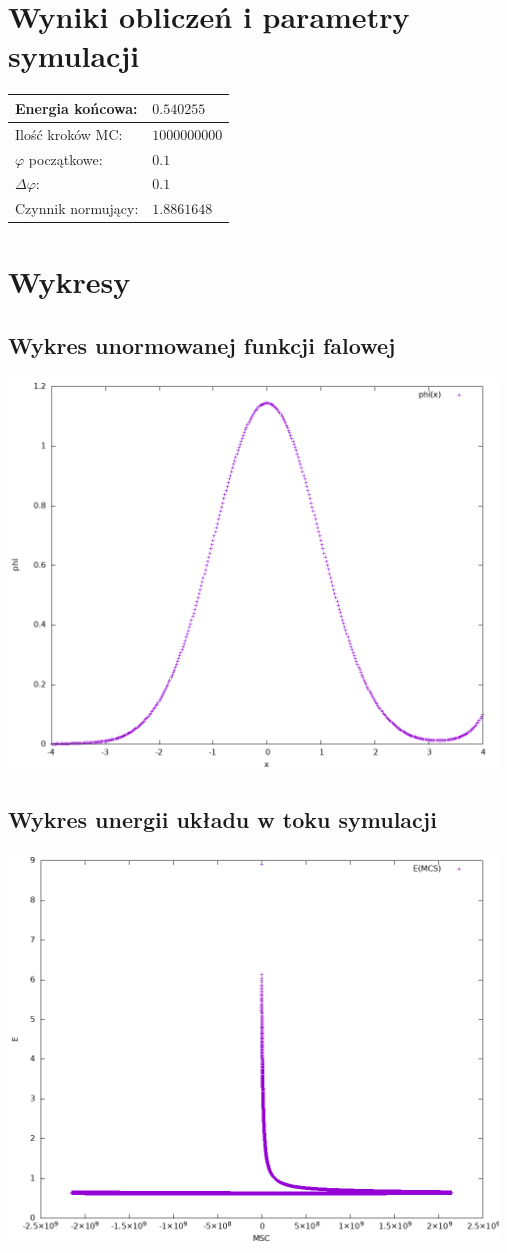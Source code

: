 \documentclass{article}
\begin{document}
\newpage
\section{Wyniki obliczeń i parametry symulacji}
\begin{center}
\begin{tabular}{p{5cm}|p{5cm}}
	Energia końcowa: & $0.540255$\\
	\hline
	Ilość kroków MC: & $1 000 000 000$\\
	\hline
	$\varphi$ początkowe: & $0.1$\\
	\hline
	$\Delta \varphi:$ & $0.1$\\
	\hline
	Czynnik normujący: & $1.8861648$\\
\end{tabular}
\end{center}

\section{Wykresy}
\subsection{Wykres unormowanej funkcji falowej}
\includegraphics[width=13cm]{phi.png}

\subsection{Wykres unergii układu w toku symulacji}
\includegraphics[width=13cm]{energy.png}
\end{document}
